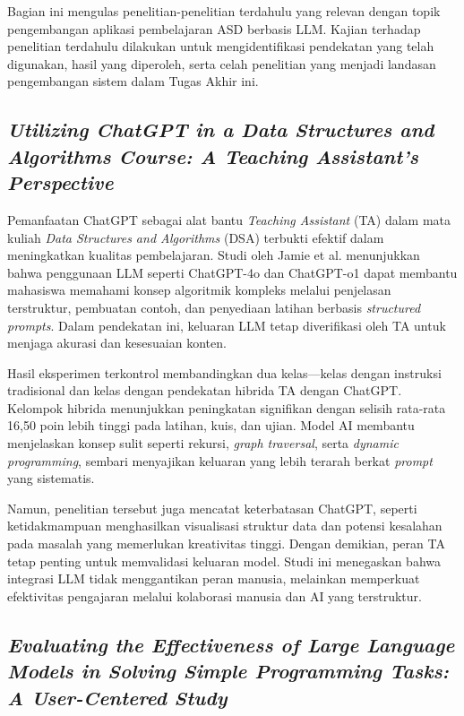 Bagian ini mengulas penelitian-penelitian terdahulu yang relevan dengan topik pengembangan aplikasi pembelajaran ASD berbasis LLM. Kajian terhadap penelitian terdahulu dilakukan untuk mengidentifikasi pendekatan yang telah digunakan, hasil yang diperoleh, serta celah penelitian yang menjadi landasan pengembangan sistem dalam Tugas Akhir ini.

\subsection{\textit{Utilizing ChatGPT in a Data Structures and Algorithms Course: A Teaching Assistant's Perspective}}

Pemanfaatan ChatGPT sebagai alat bantu \textit{Teaching Assistant} (TA) dalam mata kuliah \textit{Data Structures and Algorithms} (DSA) terbukti efektif dalam meningkatkan kualitas pembelajaran. Studi oleh Jamie et al. \cite{Jamie2024ChatGPTDSA} menunjukkan bahwa penggunaan LLM seperti ChatGPT-4o dan ChatGPT-o1 dapat membantu mahasiswa memahami konsep algoritmik kompleks melalui penjelasan terstruktur, pembuatan contoh, dan penyediaan latihan berbasis \textit{structured prompts}. Dalam pendekatan ini, keluaran LLM tetap diverifikasi oleh TA untuk menjaga akurasi dan kesesuaian konten.

Hasil eksperimen terkontrol membandingkan dua kelas---kelas dengan instruksi tradisional dan kelas dengan pendekatan hibrida TA dengan ChatGPT. Kelompok hibrida menunjukkan peningkatan signifikan dengan selisih rata-rata 16{,}50 poin lebih tinggi pada latihan, kuis, dan ujian. Model AI membantu menjelaskan konsep sulit seperti rekursi, \textit{graph traversal}, serta \textit{dynamic programming}, sembari menyajikan keluaran yang lebih terarah berkat \textit{prompt} yang sistematis.

Namun, penelitian tersebut juga mencatat keterbatasan ChatGPT, seperti ketidakmampuan menghasilkan visualisasi struktur data dan potensi kesalahan pada masalah yang memerlukan kreativitas tinggi. Dengan demikian, peran TA tetap penting untuk memvalidasi keluaran model. Studi ini menegaskan bahwa integrasi LLM tidak menggantikan peran manusia, melainkan memperkuat efektivitas pengajaran melalui kolaborasi manusia dan AI yang terstruktur.


\subsection{\textit{Evaluating the Effectiveness of Large Language Models in Solving Simple Programming Tasks: A User-Centered Study}}

